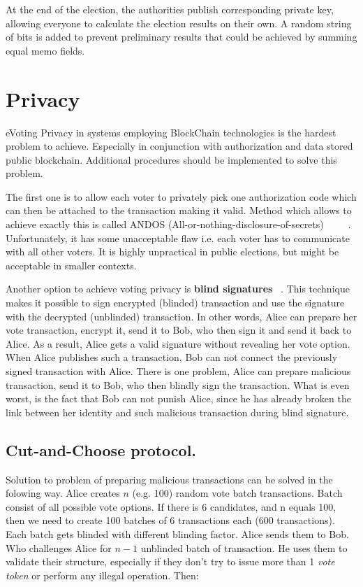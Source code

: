 \documentclass[runningheads]{llncs}
\begin{document}
At the end of the election, the authorities publish corresponding private key, allowing everyone to calculate the election results on their own. A random string of bits is added to prevent preliminary results that could be achieved by summing equal memo fields.

\section{Privacy}
\label{privacy}
eVoting Privacy in  systems employing BlockChain 
technologies is the hardest problem to achieve. 
Especially in conjunction with authorization and data stored public blockchain. Additional procedures should be implemented to  solve this problem. 

The first one is to allow each voter to privately pick one authorization code which can then be attached to the transaction making it valid. Method which allows to achieve exactly this is called ANDOS (All-or-nothing-disclosure-of-secrets) ~\cite{andos} ~\cite{salomaa1990secret} ~\cite{applied_cryptography}. Unfortunately, it has some unacceptable flaw i.e. each voter has to communicate with all other voters. It is 
highly unpractical in public elections, but might be acceptable in smaller contexts. 

Another option to achieve voting   privacy is \textbf{blind signatures} ~\cite{applied_cryptography}. This technique makes it possible to sign encrypted (blinded) transaction and use the signature with the decrypted (unblinded) transaction. In other words, Alice can prepare her vote transaction, encrypt it, send it to Bob, who then sign it and send it back to Alice. As a result, Alice gets a valid signature without revealing her vote option. When Alice publishes such a transaction, Bob can not connect the previously signed transaction with Alice. 
There is one problem, Alice can prepare malicious transaction, send it to Bob, who then blindly sign the transaction. What is even worst, is the fact that Bob can not punish Alice, since he has already broken the link between her identity and such malicious transaction during blind signature.

\subsection{Cut-and-Choose protocol.}
\label{cut-and-choose}

Solution to  problem of preparing 
malicious transactions can be solved in the folowing way.  
Alice creates \(n\) (e.g. 100) random vote batch transactions. Batch consist of all possible vote options. If there is 6 candidates, and n equals 100, then we need to create 100 batches of 6 transactions each (600 transactions). Each batch gets blinded with different blinding factor. Alice sends them to Bob. Who challenges Alice for \(n-1\) unblinded batch of transaction. He uses them to validate their structure, especially if they don't try to issue more than 1 \textit{vote token} or perform any illegal operation. Then:
\end{document}
